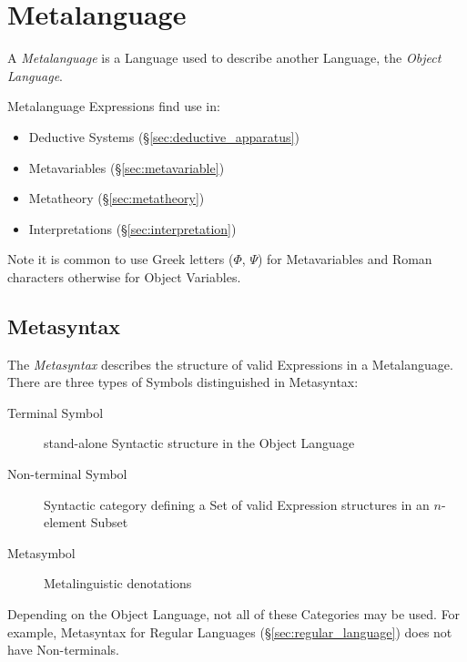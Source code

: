 \section{Metalanguage}\label{sec:metalanguage}

A \emph{Metalanguage} is a Language used to describe another Language,
the \emph{Object Language}.

Metalanguage Expressions find use in:
\begin{itemize}
  \item Deductive Systems (\S\ref{sec:deductive_apparatus})
  \item Metavariables (\S\ref{sec:metavariable})
  \item Metatheory (\S\ref{sec:metatheory})
  \item Interpretations (\S\ref{sec:interpretation})
\end{itemize}

Note it is common to use Greek letters ($\Phi$, $\Psi$) for
Metavariables and Roman characters otherwise for Object Variables.



\subsection{Metasyntax}\label{sec:metasyntax}

The \emph{Metasyntax} describes the structure of valid Expressions in
a Metalanguage. There are three types of Symbols distinguished in
Metasyntax:
\begin{description}
  \item [Terminal Symbol] stand-alone Syntactic structure in the
    Object Language
  \item [Non-terminal Symbol] Syntactic category defining a Set of
    valid Expression structures in an $n$-element Subset
  \item [Metasymbol] Metalinguistic denotations
\end{description}
Depending on the Object Language, not all of these Categories may be
used. For example, Metasyntax for Regular Languages
(\S\ref{sec:regular_language}) does not have Non-terminals.



